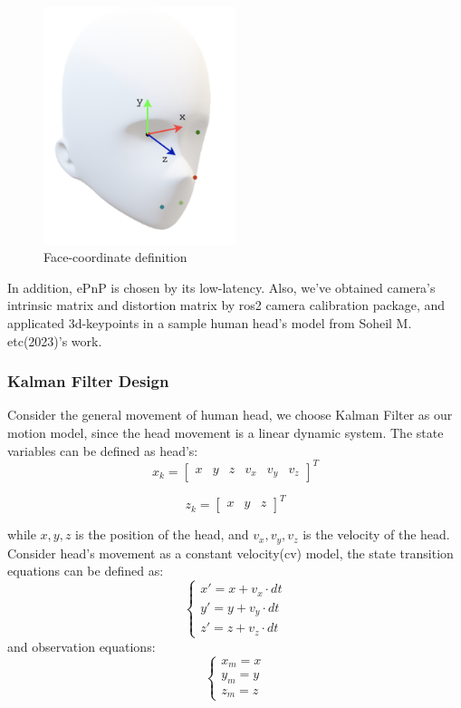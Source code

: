 \begin{figure}[htb]
    \centering
    \includegraphics[width=0.5\textwidth]{figures/Preliminaries/faceFrame.png}
    \caption{Face-coordinate definition}\label{F:test-a}
\end{figure}

In addition, ePnP is chosen by its low-latency\cite{EPnP_2009}. Also, we've obtained camera's intrinsic matrix and distortion matrix by ros2 camera calibration package\cite{ros2_camera_calibration}, and applicated 3d-keypoints in a sample human head's model from Soheil M. etc(2023)'s work.\cite{soheil2023facial}

\subsubsection{Kalman Filter Design}
Consider the general movement of human head, we choose Kalman Filter as our motion model, since the head movement is a linear dynamic system. The state variables can be defined as head's:
$$
x_k = \begin{bmatrix} x & y & z & v_x & v_y & v_z \end{bmatrix}^T
$$

$$
z_k = \begin{bmatrix} x & y & z \end{bmatrix}^T
$$

while $x, y, z$ is the position of the head, and $v_x, v_y, v_z$ is the velocity of the head. 
Consider head's movement as a constant velocity(cv) model, the state transition equations can be defined as:
$$
\begin{cases}
    x' = x + v_{x} \cdot dt \\
    y' = y + v_{y} \cdot dt \\
    z' = z + v_{z} \cdot dt 
\end{cases}
$$
and observation equations:
$$
\begin{cases}
    x_m = x \\
    y_m = y \\
    z_m = z
\end{cases}
$$

